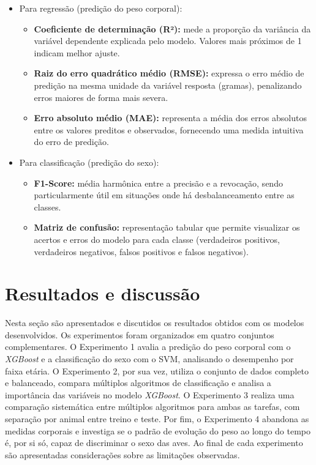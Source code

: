 \documentclass[12pt]{article}
\begin{document}
\begin{itemize}
  \item Para regressão (predição do peso corporal):
  \begin{itemize}
    \item \textbf{Coeficiente de determinação (R²):} mede a proporção da
      variância da variável dependente explicada pelo modelo. Valores mais
      próximos de 1 indicam melhor ajuste.
    \item \textbf{Raiz do erro quadrático médio (RMSE):} expressa o erro médio
      de predição na mesma unidade da variável resposta (gramas), penalizando
      erros maiores de forma mais severa.
    \item \textbf{Erro absoluto médio (MAE):} representa a média dos erros
      absolutos entre os valores preditos e observados, fornecendo uma medida
      intuitiva do erro de predição.
  \end{itemize}
  \item Para classificação (predição do sexo):
  \begin{itemize}
    \item \textbf{F1-Score:} média harmônica entre a precisão e a revocação,
      sendo particularmente útil em situações onde há desbalanceamento entre as
      classes.
    \item \textbf{Matriz de confusão:} representação tabular que permite
      visualizar os acertos e erros do modelo para cada classe (verdadeiros
      positivos, verdadeiros negativos, falsos positivos e falsos negativos).
  \end{itemize}
\end{itemize}

\section{Resultados e discussão}

Nesta seção são apresentados e discutidos os resultados obtidos com os modelos
desenvolvidos. Os experimentos foram organizados em quatro conjuntos
complementares. O Experimento 1 avalia a predição do peso corporal com o
\textit{XGBoost} e a classificação do sexo com o SVM, analisando o desempenho
por faixa etária. O Experimento 2, por sua vez, utiliza o conjunto de dados
completo e balanceado, compara múltiplos algoritmos de classificação e analisa
a importância das variáveis no modelo \textit{XGBoost}. O Experimento 3 realiza
uma comparação sistemática entre múltiplos algoritmos para ambas as tarefas,
com separação por animal entre treino e teste. Por fim, o Experimento 4 abandona
as medidas corporais e investiga se o padrão de evolução do peso ao longo do
tempo é, por si só, capaz de discriminar o sexo das aves. Ao final de cada
experimento são apresentadas considerações sobre as limitações observadas.
\end{document}

